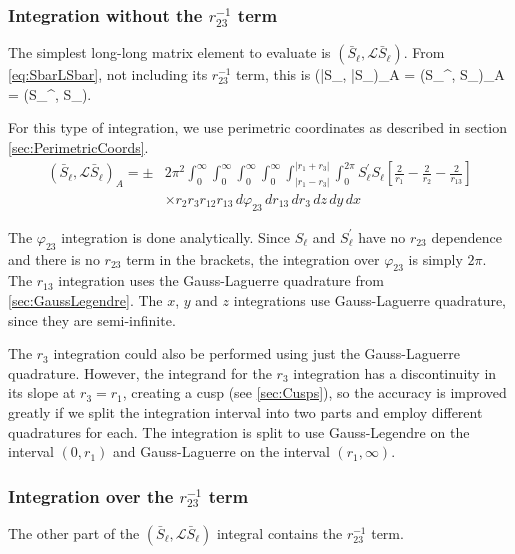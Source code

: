 \documentclass[Dissertation.tex]{subfiles}
\begin{document}
\subsubsection{Integration without the \texorpdfstring{$r_{23}^{-1}$} {1/r23} term}
\label{sec:LongLongNoR23}
The simplest long-long matrix element to evaluate is $(\bar{S}_\ell,\mathcal{L} \bar{S}_\ell)$.  From \cref{eq:SbarLSbar}, not including its $r_{23}^{-1}$ term, this is
\beq
(\bar{S}_\ell, \bar{S}_\ell)_A = \pm \left(S_\ell^\prime, S_\ell\right)_A = \pm \left(S_\ell^\prime,  S_\ell\right).
\eeq

For this type of integration, we use perimetric coordinates as described in section \ref{sec:PerimetricCoords}.
\begin{align}
\label{eq:SBarSBarInt}
(\bar{S}_\ell,\mathcal{L} \bar{S}_\ell)_A = \pm &2\pi^2 \int_0^\infty \int_0^\infty \int_0^\infty \int_0^\infty \int_{|r_1 - r_3|}^{|r_1 + r_3|} \int_0^{2\pi}  S_\ell^\prime S_\ell \left[ \frac{2}{r_1} - \frac{2}{r_2} - \frac{2}{r_{13}}\right] \\
&\times r_2 r_3 r_{12} r_{13}\, d\varphi_{23}\, dr_{13}\, dr_3\, dz\, dy\, dx
\end{align}

The $\varphi_{23}$ integration is done analytically. Since $S_\ell$ and
$S_\ell^\prime$ have no $r_{23}$ dependence and there is no $r_{23}$ term in
the brackets, the integration over $\varphi_{23}$ is simply $2\pi$. The
$r_{13}$ integration uses the Gauss-Laguerre quadrature from
\cref{sec:GaussLegendre}. The $x$, $y$ and $z$ integrations use Gauss-Laguerre 
quadrature, since they are semi-infinite.

The $r_3$ integration could also be performed using just the Gauss-Laguerre 
quadrature. However, the integrand for the $r_3$ integration has a 
discontinuity in its slope at $r_3=r_1$, creating a cusp
(see \cref{sec:Cusps}), so the accuracy is improved greatly if we split the
integration interval into two parts and employ different quadratures for each.
The integration is split to use Gauss-Legendre on the interval $(0,r_1)$ and
Gauss-Laguerre on the interval $(r_1,\infty)$.

\subsubsection{Integration over the \texorpdfstring{$r_{23}^{-1}$} {1/r23} term}
\label{sec:LongLongR23}
The other part of the $(\bar{S}_\ell,\mathcal{L} \bar{S}_\ell)$ integral
contains the $r_{23}^{-1}$ term.
\end{document}
